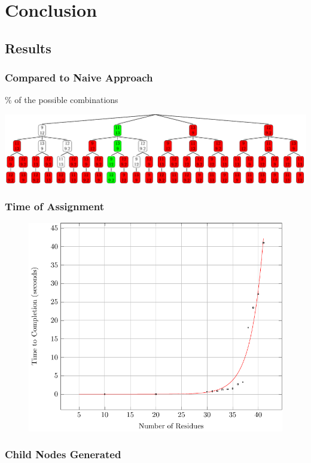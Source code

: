 \documentclass{beamer}
\begin{document}
\section{Conclusion} 

\subsection{Results}
\begin{frame}
	\frametitle{Compared to Naive Approach}
	\vspace{-24pt}
	\% of the possible combinations

	\vspace{24pt}
	\center
	\includegraphics[width=\textwidth]{tilePlacement/naive}
\end{frame}

\begin{frame}
	\frametitle{Time of Assignment}
	\begin{figure}[H]
	\begin{center}
	\includegraphics[width=.65\textwidth]{plot}
	\end{center}
	\end{figure}
\end{frame}

\begin{frame}
	\frametitle{Child Nodes Generated}
	\begin{figure}[H]
	\begin{center}
	\resizebox{!}{.6\paperheight}{}
	\end{center}
	\end{figure}
\end{frame}
\end{document}
